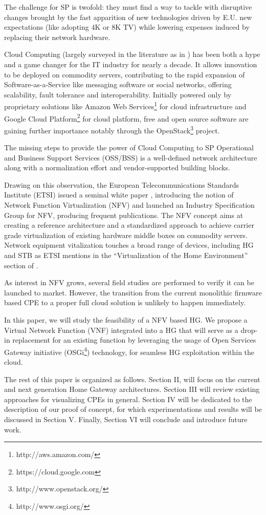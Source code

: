 The challenge for SP is twofold: they must find a way to tackle with disruptive changes brought by the fast apparition of new technologies driven by E.U. new expectations (like adopting 4K or 8K TV) while lowering expenses induced by replacing their network hardware.

Cloud Computing (largely surveyed in the literature as in \cite{rimal_taxonomy_2009}) has been both a hype and a game changer for the IT industry for nearly a decade.
It allows innovation to be deployed on commodity servers, contributing to the rapid expansion of Software-as-a-Service like messaging software or social networks, offering scalability, fault tolerance and interoperability.
Initially powered only by proprietary solutions like Amazon Web Services\footnote{http://aws.amazon.com/} for cloud infrastructure and Google Cloud Platform\footnote{https://cloud.google.com} for cloud platform, free and open source software are gaining further importance notably through the OpenStack\footnote{http://www.openstack.org/} project. 

The missing steps to provide the power of Cloud Computing to SP Operational and Business Support Services (OSS/BSS) is a well-defined network architecture along with a normalization effort and vendor-supported building blocks.

Drawing on this observation, the European Telecommunications Standards Institute (ETSI) issued a seminal white paper \cite{_network_2012}, introducing the notion of Network Function Virtualization (NFV) and launched an Industry Specification Group for NFV, producing frequent publications.
The NFV concept aims at creating a reference architecture and a standardized approach to achieve carrier grade virtualization of existing hardware middle boxes on commodity servers.
Network equipment vitalization touches a broad range of devices, including HG and STB as ETSI mentions in the “Virtualization of the Home Environment” section of . 

As interest in NFV grows, several field studies are performed to verify it can be launched to market.
However, the transition from the current monolithic firmware based CPE to a proper full cloud solution is unlikely to happen immediately.

In this paper, we will study the feasibility of a NFV based HG. We propose a Virtual Network Function (VNF) integrated into a HG that will serve as a drop-in replacement for an existing function by leveraging the usage of Open Services Gateway initiative (OSGi\footnote{http://www.osgi.org/}) technology, for seamless HG exploitation within the cloud.

The rest of this paper is organized as follows.
Section II, will focus on the current and next generation Home Gateway architectures.
Section III will review existing approaches for visualizing CPEs in general.
Section IV will be dedicated to the description of our proof of concept, for which experimentations and results will be discussed in Section V.
Finally, Section VI will conclude and introduce future work.
